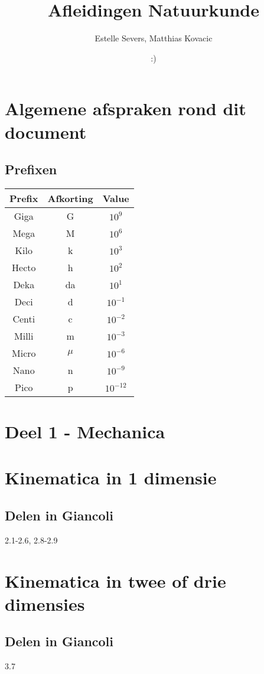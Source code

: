 \documentclass[12pt,a4paper]{article}
\author{Estelle Severs, Matthias Kovacic}
\title{Afleidingen Natuurkunde}
\date{:)}
\begin{document}
	\maketitle
	\tableofcontents
	\newpage
	\section{Algemene afspraken rond dit document}
	\subsection{Prefixen}
		\begin{center}
		\begin{tabular}{ | c | c | c | }
		\hline
			 Prefix & Afkorting & Value \\ 
		\hline
			Giga & G & $10^{9}$ \\ 
			Mega & M & $10^{6}$ \\  
 			Kilo & k & $10^{3}$ \\   
 			Hecto & h & $10^{2}$ \\   
 			Deka & da & $10^{1}$ \\   
 			Deci & d & $10^{-1}$ \\   
 			Centi & c & $10^{-2}$ \\   
 			Milli & m & $10^{-3}$ \\   
 			Micro & $\mu$ & $10^{-6}$ \\   
 			Nano & n & $10^{-9}$ \\   
 			Pico & p & $10^{-12}$ \\   
 		\hline
		\end{tabular}
		\end{center}
	\newpage
	\section{Deel 1 - Mechanica}
	\section{Kinematica in 1 dimensie}
	\subsection{Delen in Giancoli}
	2.1-2.6, 2.8-2.9
	\section{Kinematica in twee of drie dimensies}
	\subsection{Delen in Giancoli}
	3.7
\end{document}

